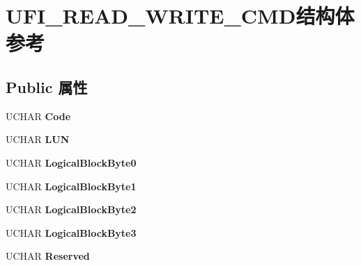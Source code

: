 \hypertarget{struct_u_f_i___r_e_a_d___w_r_i_t_e___c_m_d}{}\section{U\+F\+I\+\_\+\+R\+E\+A\+D\+\_\+\+W\+R\+I\+T\+E\+\_\+\+C\+M\+D结构体 参考}
\label{struct_u_f_i___r_e_a_d___w_r_i_t_e___c_m_d}
\subsection*{Public 属性}
\begin{DoxyCompactItemize}
\item 
\mbox{\label{struct_u_f_i___r_e_a_d___w_r_i_t_e___c_m_d_a8b2a347a7819a0d27839c5533b6b8ce1}} 
U\+C\+H\+AR {\bfseries Code}
\item 
\mbox{\label{struct_u_f_i___r_e_a_d___w_r_i_t_e___c_m_d_af6ae28355dd7f12f00d9fc6723ad2843}} 
U\+C\+H\+AR {\bfseries L\+UN}
\item 
\mbox{\label{struct_u_f_i___r_e_a_d___w_r_i_t_e___c_m_d_a3ae3baab8bfe5dcf0ee7dd3b5b318584}} 
U\+C\+H\+AR {\bfseries Logical\+Block\+Byte0}
\item 
\mbox{\label{struct_u_f_i___r_e_a_d___w_r_i_t_e___c_m_d_a01983102c8cb911d95f6f54479035b1f}} 
U\+C\+H\+AR {\bfseries Logical\+Block\+Byte1}
\item 
\mbox{\label{struct_u_f_i___r_e_a_d___w_r_i_t_e___c_m_d_a2ff4dba5fad351f7b5ed0a0393bbf40b}} 
U\+C\+H\+AR {\bfseries Logical\+Block\+Byte2}
\item 
\mbox{\label{struct_u_f_i___r_e_a_d___w_r_i_t_e___c_m_d_a8d292a159877492dbea9f5c5ce7f937f}} 
U\+C\+H\+AR {\bfseries Logical\+Block\+Byte3}
\item 
\mbox{\label{struct_u_f_i___r_e_a_d___w_r_i_t_e___c_m_d_a56c1794649d6a42acac5209007e28bc3}} 
U\+C\+H\+AR {\bfseries Reserved}

\end{DoxyCompactItemize}
